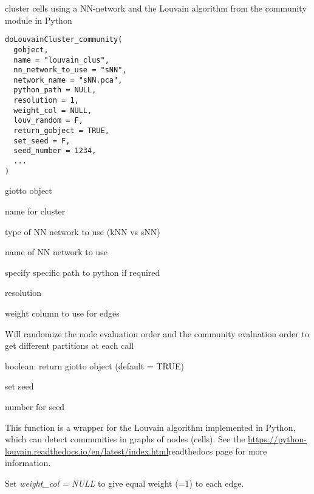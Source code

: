 \documentclass[a4paper]{book}
\begin{document}
%
\begin{Description}\relax
cluster cells using a NN-network and the Louvain algorithm from the community module in Python
\end{Description}
%
\begin{Usage}
\begin{verbatim}
doLouvainCluster_community(
  gobject,
  name = "louvain_clus",
  nn_network_to_use = "sNN",
  network_name = "sNN.pca",
  python_path = NULL,
  resolution = 1,
  weight_col = NULL,
  louv_random = F,
  return_gobject = TRUE,
  set_seed = F,
  seed_number = 1234,
  ...
)
\end{verbatim}
\end{Usage}
%
\begin{Arguments}
\begin{ldescription}
\item[\code{gobject}] giotto object

\item[\code{name}] name for cluster

\item[\code{nn\_network\_to\_use}] type of NN network to use (kNN vs sNN)

\item[\code{network\_name}] name of NN network to use

\item[\code{python\_path}] specify specific path to python if required

\item[\code{resolution}] resolution

\item[\code{weight\_col}] weight column to use for edges

\item[\code{louv\_random}] Will randomize the node evaluation order and the community evaluation
order to get different partitions at each call

\item[\code{return\_gobject}] boolean: return giotto object (default = TRUE)

\item[\code{set\_seed}] set seed

\item[\code{seed\_number}] number for seed
\end{ldescription}
\end{Arguments}
%
\begin{Details}\relax
This function is a wrapper for the Louvain algorithm implemented in Python,
which can detect communities in graphs of nodes (cells).
See the \url{https://python-louvain.readthedocs.io/en/latest/index.html}readthedocs
page for more information.

Set \emph{weight\_col = NULL} to give equal weight (=1) to each edge.
\end{Details}
\end{document}
